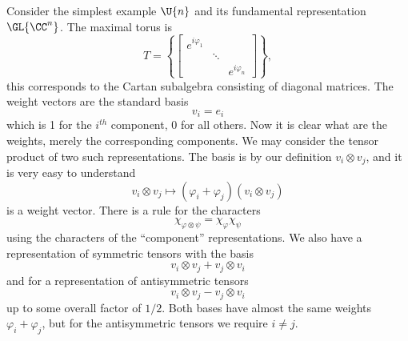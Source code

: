 Consider the simplest example $\U{n}$ and its fundamental
representation $\GL{\CC^{n}}$. The maximal torus is
\begin{equation}
T = \left\{\begin{bmatrix}
 e^{i\varphi_{1}} &        &  \\
              & \ddots &  \\
              &        & e^{i\varphi_{n}}
\end{bmatrix}
\right\},
\end{equation}
this corresponds to the Cartan subalgebra consisting of diagonal
matrices. The weight vectors are the standard basis
\begin{equation}
v_{i} = e_{i}
\end{equation}
which is 1 for the $i^{th}$ component, 0 for all others. Now it
is clear what are the weights, merely the corresponding
components. We may consider the tensor product of two such
representations. The basis is by our definition $v_{i}\otimes
v_{j}$, and it is very easy to understand
\begin{equation}
v_{i}\otimes v_{j}\mapsto (\varphi_{i}+\varphi_{j})(v_{i}\otimes v_{j})
\end{equation}
is a weight vector. There is a rule for the characters
\begin{equation}
\chi_{\varphi\otimes\psi}=\chi_{\varphi}\chi_{\psi}
\end{equation}
using the characters of the ``component'' representations. We
also have a representation of symmetric tensors with the basis
\begin{equation}
v_{i}\otimes v_{j}+v_{j}\otimes v_{i}
\end{equation}
and for a representation of antisymmetric tensors
\begin{equation}
v_{i}\otimes v_{j}-v_{j}\otimes v_{i}
\end{equation}
up to some overall factor of $1/2$. Both bases have almost the
same weights $\varphi_{i}+\varphi_{j}$, but for the antisymmetric
tensors we require $i\not=j$.



